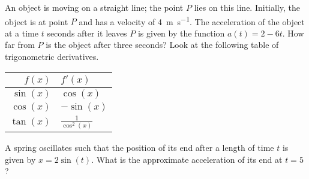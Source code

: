 \begin{questions}
  \question An object is moving on a straight line; the point $ P $ lies on this line. Initially, the object is at point $ P $ and
            has a velocity of \SI{4}{\metre\per\second}. The acceleration of the object at a time $ t $ seconds after it leaves $ P $
            is given by the function $ a(t) = 2 - 6t $. How far from $ P $ is the object after three seconds?
  \question Look at the following table of trigonometric derivatives.
            \begin{center}
              \begin{tabular}{r|l}
                $ f(x) $ & $ f'(x) $\\
                \hline
                $ \sin(x) $ & $ \cos(x) $\\
                $ \cos(x) $ & $ -\sin(x) $\\
                $ \tan(x) $ & $ \frac{1}{\cos^2(x)} $
              \end{tabular}
            \end{center}
            A spring oscillates such that the position of its end after a length
            of time $ t $ is given by $ x = 2\sin(t) $. What is the approximate
            acceleration of its end at $ t = 5 $?
\end{questions}


